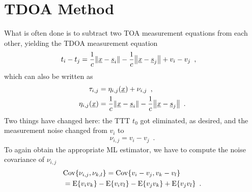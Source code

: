 \documentclass[conference]{IEEEtran}
\begin{document}
\section{TDOA Method} 
What is often done is to subtract two \ac{TOA} measurement equations from each other, yielding the \ac{TDOA} measurement equation
\begin{align}
    t_i-t_j &= \frac{1}{c}\mathopen{}\left\| {\underline{x}}-{\underline{s}}_i \right\|\mathclose{} - \frac{1}{c}\mathopen{}\left\| {\underline{x}}-{\underline{s}}_j \right\|\mathclose{} + v_i - v_j \enspace,
\end{align}
which can also be written as 
\begin{align}
    \tau_{i,j} &= \eta_{i,j}({\underline{x}}) + \nu_{i,j} \enspace, \\
    \eta_{i,j}({\underline{x}}) &= \frac{1}{c}\mathopen{}\left\| {\underline{x}}-{\underline{s}}_i \right\|\mathclose{} - \frac{1}{c}\mathopen{}\left\| {\underline{x}}-{\underline{s}}_j \right\|\mathclose{} \enspace. \label{eq:TDOA:etaij}
\end{align}
%
%
Two things have changed here: the \ac{TTT} $t_0$ got eliminated, as desired, and the measurement noise changed from $v_i$ to 
\begin{align}
    \nu_{i,j} = v_i - v_j \enspace. 
\end{align}
%
%
To again obtain the appropriate \ac{ML} estimator, we have to compute the noise covariance of $\nu_{i,j}$ 
\begin{align}
    &\Cov{\nu_{i,j}, \nu_{k,l}} 
    = \Cov{v_i - v_j, v_k - v_l} \label{eq:TDOA:E}\\
    &= \E{v_i v_k} - \E{v_i v_l} - \E{v_j v_k} + \E{v_j v_l} \enspace. 
\end{align}

%
%
\end{document}
